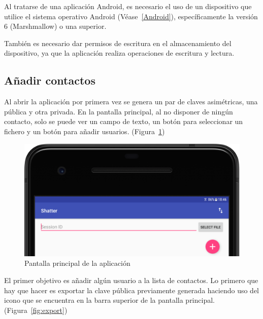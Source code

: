 Al tratarse de una aplicación Android, es necesario el uso de un dispositivo que utilice el sistema operativo Android (Véase~\ref{Android}), específicamente la versión 6 (Marshmallow) o una superior.

También es necesario dar permisos de escritura en el almacenamiento del dispositivo, ya que la aplicación realiza operaciones de escritura y lectura.

\subsection{Añadir contactos}

Al abrir la aplicación por primera vez se genera un par de claves asimétricas, una pública y otra privada. En la pantalla principal, al no disponer de ningún contacto, solo se puede ver un campo de texto, un botón para seleccionar un fichero y un botón para añadir usuarios. (Figura~\ref{fig:home})

\begin{figure}[!htb]
  \centering
  \includegraphics[scale=0.4]{Figures/home}
  \decoRule
  \caption[Shatter (Home)]{Pantalla principal de la aplicación}
  \label{fig:home}
\end{figure}

El primer objetivo es añadir algún usuario a la lista de contactos. Lo primero que hay que hacer es exportar la clave pública previamente generada haciendo uso del icono que se encuentra en la barra superior de la pantalla principal. (Figura~\ref{fig:export})

